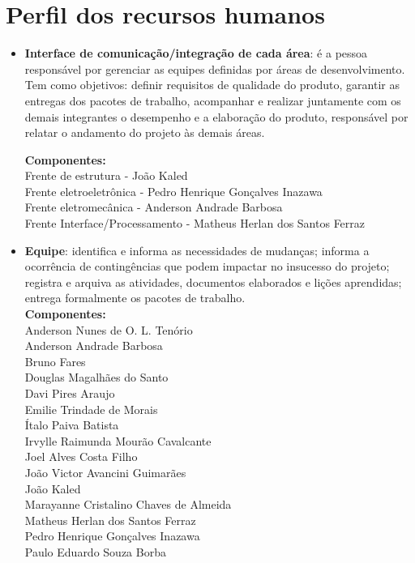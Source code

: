   \section*{Perfil dos recursos humanos}
  \begin{itemize}
   \item \textbf{Interface de comunicação/integração de cada área}: é a pessoa responsável por gerenciar as equipes definidas por áreas de desenvolvimento. Tem como objetivos: definir requisitos de qualidade do produto, garantir as entregas dos pacotes de trabalho, acompanhar e realizar juntamente com os demais integrantes o desempenho e a elaboração do produto, responsável por relatar o andamento do projeto às demais áreas.
   
\textbf{Componentes:}\\
Frente de estrutura - João Kaled\\
Frente eletroeletrônica - Pedro Henrique Gonçalves Inazawa\\
Frente eletromecânica - Anderson Andrade Barbosa\\
Frente Interface/Processamento - Matheus Herlan dos Santos Ferraz\\


  \item \textbf{Equipe}: identifica e informa as necessidades de mudanças; informa a ocorrência de contingências que podem impactar no insucesso do projeto; registra e arquiva as atividades, documentos elaborados e lições aprendidas; entrega formalmente os pacotes de trabalho.\\
  
\textbf{Componentes:}\\
Anderson Nunes de O. L. Tenório\\
Anderson Andrade Barbosa\\
Bruno Fares\\
Douglas Magalhães do Santo\\
Davi Pires Araujo\\
Emilie Trindade de Morais\\
Ítalo Paiva Batista\\
Irvylle Raimunda Mourão Cavalcante\\
Joel Alves Costa Filho\\
João Victor Avancini Guimarães\\
João Kaled\\
Marayanne Cristalino Chaves de Almeida\\
Matheus Herlan dos Santos Ferraz\\
Pedro Henrique Gonçalves Inazawa\\
Paulo Eduardo Souza Borba\\
  \end{itemize}
\newpage

